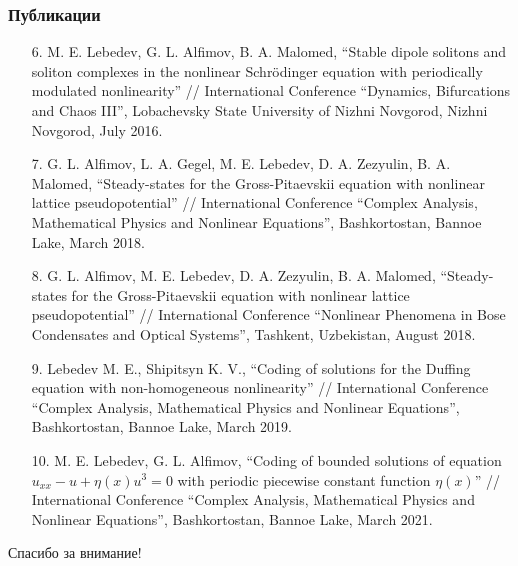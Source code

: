 \documentclass [10pt] {beamer}
\begin{document}
\begin{frame}
	\frametitle{Публикации}
	\begin{scriptsize}
	\begin{enumerate}
		\setlength\itemsep{10pt}
		\item[6.] M. E. Lebedev, G. L. Alfimov, B. A. Malomed, ``Stable dipole solitons and soliton complexes in the nonlinear Schrödinger equation with periodically modulated nonlinearity'' // International Conference ``Dynamics, Bifurcations and Chaos III'', Lobachevsky State University of Nizhni Novgorod, Nizhni Novgorod, July 2016.
		\item[7.] G. L. Alfimov, L. A. Gegel, M. E. Lebedev, D. A. Zezyulin, B. A. Malomed, ``Steady-states for the Gross-Pitaevskii equation with nonlinear lattice pseudopotential'' // International Conference ``Complex Analysis, Mathematical Physics and Nonlinear Equations'', Bashkortostan, Bannoe Lake, March 2018.
		\item[8.] G. L. Alfimov, M. E. Lebedev, D. A. Zezyulin, B. A. Malomed, ``Steady-states for the Gross-Pitaevskii equation with nonlinear lattice pseudopotential'' // International Conference ``Nonlinear Phenomena in Bose Condensates and Optical Systems'', Tashkent, Uzbekistan, August 2018.
		\item[9.] Lebedev M. E., Shipitsyn K. V., ``Coding of solutions for the Duffing equation with non-homogeneous nonlinearity'' // International Conference ``Complex Analysis, Mathematical Physics and Nonlinear Equations'', Bashkortostan, Bannoe Lake, March 2019.
		\item[10.] M. E. Lebedev, G. L. Alfimov, ``Coding of bounded solutions of equation $u_{xx} - u + \eta(x) u^3 = 0$ with periodic piecewise constant function $\eta(x)$'' // International Conference ``Complex Analysis, Mathematical Physics and Nonlinear Equations'', Bashkortostan, Bannoe Lake, March 2021.
	\end{enumerate}
	\end{scriptsize}
\end{frame}

\begin{frame}
	\begin{center}
		{\Huge Спасибо за внимание!}
	\end{center}
\end{frame}
	
\end{document}
